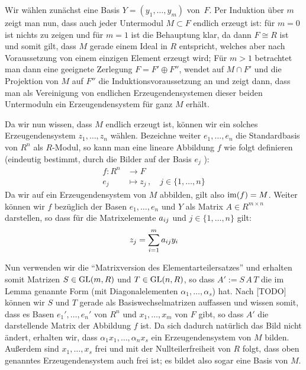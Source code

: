 \begin{proofsketch}
    Wir wählen zunächst eine Basis $Y = (y_1,\ldots,y_m)$ von~$F$. Per Induktion
    über $m$ zeigt man nun, dass auch jeder Untermodul $M\subset F$ endlich
    erzeugt ist: für $m=0$ ist nichts zu zeigen und für $m=1$ ist die Behauptung
    klar, da dann $F\cong R$ ist und somit gilt, dass $M$ gerade einem Ideal in
    $R$ entspricht, welches aber nach Voraussetzung von einem einzigen Element erzeugt
    wird; Für $m>1$ betrachtet man dann eine geeignete Zerlegung $F = F'
    \oplus F''$, wendet auf $M\cap F'$ und die Projektion von $M$ auf $F''$ die
    Induktionsvoraussetzung an und zeigt dann, dass man als Vereinigung von
    endlichen Erzeugendensystemen dieser beiden Untermoduln ein
    Erzeugendensystem für ganz $M$ erhält.
    
    Da wir nun wissen, dass $M$ endlich erzeugt ist, können wir ein solches
    Erzeugendensystem $z_1,\ldots,z_n$ wählen. Bezeichne weiter $e_1,\ldots,e_n$
    die Standardbasis von $R^n$ als $R$-Modul, so kann man eine lineare
    Abbildung $f$ wie folgt definieren (eindeutig bestimmt, durch die Bilder auf
    der Basis $e_j$%
    ):
    \begin{align*}
        f\colon R^n &\to F  \\
        e_j &\mapsto z_j \,, \quad j\in\{1,\ldots,n\}
    \end{align*}
    Da wir auf ein Erzeugendensystem von $M$ abbilden, gilt also
    $\operatorname{im}(f) = M$. Weiter können wir $f$ bezüglich der Basen $e_1,\ldots,e_n$
    und $Y$ als Matrix $A\in R^{m\times n}$ darstellen, so dass für die
    Matrixelemente $a_{ij}$ und $j\in\{1,\ldots,n\}$ gilt:
    \[ z_j = \sum_{i=1}^m a_{ij} y_i \]
    
    Nun verwenden wir die \enquote{Matrixversion des Elementarteilersatzes} %
    und erhalten somit Matrizen $S\in\mathrm{GL}(m,R)$ und $T\in\mathrm{GL}(n,R)$, so
    dass $A' := S\,A\,T$ die im Lemma genannte Form (mit Diagonalelementen
    $\alpha_1,\ldots,\alpha_s$) hat. Nach [TODO] %
    können wir $S$ und $T$ gerade als Basiswechselmatrizen auffassen und
    wissen somit, dass es Basen $e_1',\ldots,e_n'$ von $R^n$ und
    $x_1,\ldots,x_m$ von $F$ gibt, so dass $A'$ die darstellende Matrix der
    Abbildung $f$ ist. Da sich dadurch natürlich das Bild nicht ändert, erhalten
    wir, dass $\alpha_1 x_1, \ldots, \alpha_n x_s$ ein Erzeugendensystem von $M$
    bilden. Außerdem sind $x_1,\ldots,x_s$ frei und mit der Nullteilerfreiheit
    von $R$ folgt, dass oben genanntes Erzeugendensystem auch frei ist; es
    bildet also sogar eine Basis von $M$.
    \\
\end{proofsketch}

